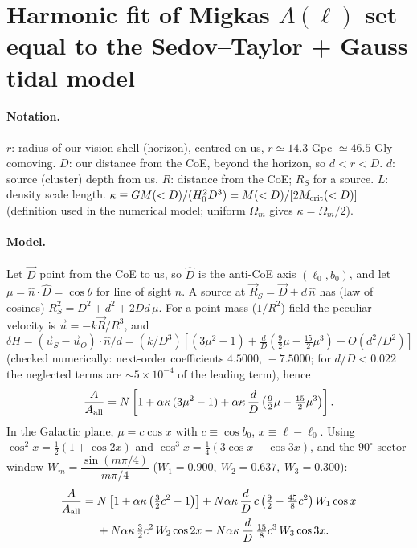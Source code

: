 \documentclass[11pt]{article}
\begin{document}
\section*{Harmonic fit of Migkas $A(\ell)$ set equal to the Sedov--Taylor + Gauss tidal model}

\paragraph{Notation.} $r$: radius of our vision shell (horizon), centred on us, $r\simeq14.3$ Gpc $\simeq46.5$ Gly comoving.
$D$: our distance from the CoE, beyond the horizon, so $d<r<D$. $d$: source (cluster) depth from us. $R$: distance from the CoE; $R_S$ for a source.
$L$: density scale length. $\kappa\equiv GM(<D)/(H_0^2D^3)=M(<D)/[2M_{\rm crit}(<D)]$ (definition used in the numerical model; uniform $\Omega_m$ gives $\kappa=\Omega_m/2$).

\paragraph{Model.} Let $\vec D$ point from the CoE to us, so $\hat D$ is the anti-CoE axis $(\ell_0,b_0)$, and let $\mu=\hat n\cdot\hat D=\cos\theta$ for line of sight $\hat n$.
A source at $\vec R_S=\vec D+d\,\hat n$ has (law of cosines) $R_S^2=D^2+d^2+2Dd\,\mu$. For a point-mass ($1/R^2$) field the peculiar velocity is $\vec u=-k\vec R/R^3$, and
$\delta H=(\vec u_S-\vec u_O)\cdot\hat n/d=(k/D^3)\left[(3\mu^2-1)+\tfrac{d}{D}\left(\tfrac92\mu-\tfrac{15}{2}\mu^3\right)+O(d^2/D^2)\right]$
(checked numerically: next-order coefficients $4.5000,\,-7.5000$; for $d/D<0.022$ the neglected terms are $\sim5\times10^{-4}$ of the leading term), hence
\begin{equation}
\frac{A}{A_{\rm all}} = N\left[1+\alpha\kappa\,(3\mu^2-1)+\alpha\kappa\,\frac{d}{D}\left(\tfrac92\mu-\tfrac{15}{2}\mu^3\right)\right].
\end{equation}
In the Galactic plane, $\mu=c\cos x$ with $c\equiv\cos b_0$, $x\equiv\ell-\ell_0$. Using
$\cos^2x=\tfrac12(1+\cos2x)$ and $\cos^3x=\tfrac14(3\cos x+\cos3x)$, and the $90^\circ$ sector window
$W_m=\dfrac{\sin(m\pi/4)}{m\pi/4}$ ($W_1=0.900,\ W_2=0.637,\ W_3=0.300$):
\begin{align}
\frac{A}{A_{\rm all}} ={}& N\left[1+\alpha\kappa\left(\tfrac32c^2-1\right)\right]
+ N\alpha\kappa\,\frac{d}{D}\,c\left(\tfrac92-\tfrac{45}{8}c^2\right)W_1\cos x \nonumber\\
&+ N\alpha\kappa\,\tfrac32c^2\,W_2\cos2x
- N\alpha\kappa\,\frac{d}{D}\,\tfrac{15}{8}c^3\,W_3\cos3x .
\end{align}
\end{document}
